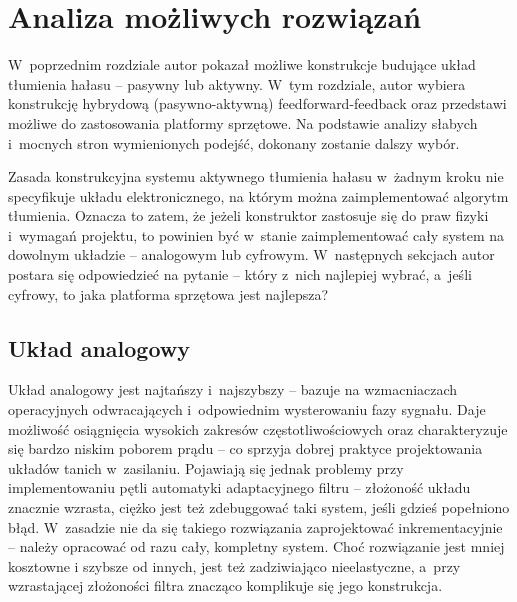 \chapter{Analiza możliwych rozwiązań}
\label{cha:możliwe_układy}
 W~poprzednim rozdziale autor pokazał możliwe konstrukcje budujące układ tłumienia hałasu -- pasywny lub aktywny. W~tym rozdziale, autor wybiera konstrukcję hybrydową (pasywno-aktywną) feedforward-feedback oraz przedstawi możliwe do zastosowania platformy sprzętowe. Na podstawie analizy słabych i~mocnych stron wymienionych podejść, dokonany zostanie dalszy wybór.

 Zasada konstrukcyjna systemu aktywnego tłumienia hałasu w~żadnym kroku nie specyfikuje układu elektronicznego, na którym można zaimplementować algorytm tłumienia. Oznacza to zatem, że jeżeli konstruktor zastosuje się do praw fizyki i~wymagań projektu, to powinien być w~stanie zaimplementować cały system na dowolnym układzie -- analogowym lub cyfrowym. W~następnych sekcjach autor postara się odpowiedzieć na pytanie -- który z~nich najlepiej wybrać, a~jeśli cyfrowy, to jaka platforma sprzętowa jest najlepsza? 
\section{Układ analogowy}
\label{sec:analog}
Układ analogowy jest najtańszy i~najszybszy %
 -- bazuje na wzmacniaczach operacyjnych odwracających i~odpowiednim wysterowaniu fazy sygnału. Daje możliwość osiągnięcia wysokich zakresów częstotliwościowych oraz charakteryzuje się bardzo niskim poborem prądu -- co sprzyja dobrej praktyce projektowania układów tanich w~zasilaniu. Pojawiają się jednak problemy przy implementowaniu pętli automatyki adaptacyjnego filtru -- złożoność układu znacznie wzrasta, ciężko jest też zdebuggować taki system, jeśli gdzieś popełniono błąd. W~zasadzie nie da się takiego rozwiązania zaprojektować inkrementacyjnie -- należy opracować od razu cały, kompletny system.%
 Choć rozwiązanie jest mniej kosztowne i szybsze od innych, jest też zadziwiająco nieelastyczne, a~przy wzrastającej złożoności filtra znacząco komplikuje się jego konstrukcja.
